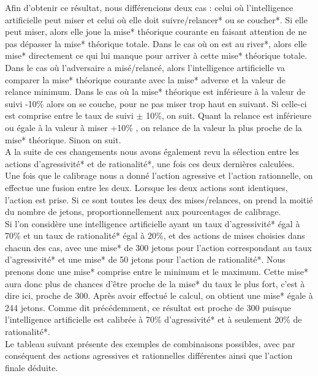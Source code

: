 \documentclass{report}
\begin{document}
Afin d'obtenir ce résultat, nous différencions deux cas : celui où l'intelligence artificielle peut miser et celui où elle doit suivre/relancer* ou se coucher*. Si elle peut miser, alors elle joue la mise* théorique courante en faisant attention de ne pas dépasser la mise* théorique totale. Dans le cas où on est au river*, alors elle mise* directement ce qui lui manque pour arriver à cette mise* théorique totale.\\

Dans le cas où l'adversaire a misé/relancé, alors l'intelligence artificielle va comparer la mise* théorique courante avec la mise* adverse et la valeur de relance minimum. Dans le cas où la mise* théorique est inférieure à la valeur de suivi -10\% alors on se couche, pour ne  pas miser trop haut en suivant. Si celle-ci est comprise entre le taux de suivi $\pm$ 10\%, on suit.
Quant la relance est inférieure ou égale à la valeur à miser +10\% , on relance de la valeur la plus proche de la mise* théorique. Sinon on suit.\\


A la suite de ces changements nous avons également revu la sélection entre les actions d'agressivité* et de rationalité*, une fois ces deux dernières calculées.\\

Une fois que le calibrage nous a donné l'action agressive et l'action rationnelle, on effectue une fusion entre les deux. Lorsque les deux actions sont identiques, l'action est prise. Si ce sont toutes les deux des mises/relances, on prend la moitié du nombre de jetons, proportionnellement aux pourcentages de calibrage.\\

Si l'on considère une intelligence artificielle ayant un taux d'agressivité* égal à  70\% et un taux de rationalité* égal à 20\%, et des actions de mises choisies dans chacun des cas, avec une mise* de 300 jetons pour l'action correspondant au taux d'agressivité* et une mise* de 50 jetons pour l'action de rationalité*. Nous prenons donc une mise* comprise entre le minimum et le maximum. Cette mise* aura donc plus de chances d'être proche de la mise* du taux le plus fort, c'est à dire ici, proche de 300. Après avoir effectué le calcul, on obtient une mise* égale à 244 jetons. Comme dit précédemment, ce résultat est proche de 300 puisque l'intelligence artificielle est calibrée à 70\% d'agressivité* et à seulement 20\% de rationalité*.\\

Le tableau suivant présente des exemples de combinaisons possibles, avec par conséquent des actions agressives et rationnelles différentes ainsi que l'action finale déduite.\\
\end{document}
